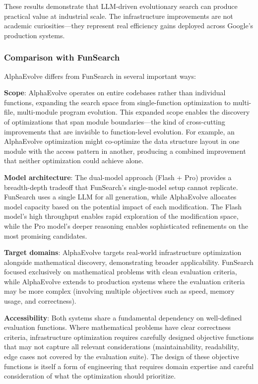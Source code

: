 These results demonstrate that LLM-driven evolutionary search can produce practical value at industrial scale. The infrastructure improvements are not academic curiosities---they represent real efficiency gains deployed across Google's production systems.

\subsubsection{Comparison with FunSearch}

AlphaEvolve differs from FunSearch in several important ways:

\textbf{Scope}: AlphaEvolve operates on entire codebases rather than individual functions, expanding the search space from single-function optimization to multi-file, multi-module program evolution. This expanded scope enables the discovery of optimizations that span module boundaries---the kind of cross-cutting improvements that are invisible to function-level evolution. For example, an AlphaEvolve optimization might co-optimize the data structure layout in one module with the access pattern in another, producing a combined improvement that neither optimization could achieve alone.

\textbf{Model architecture}: The dual-model approach (Flash + Pro) provides a breadth-depth tradeoff that FunSearch's single-model setup cannot replicate. FunSearch uses a single LLM for all generation, while AlphaEvolve allocates model capacity based on the potential impact of each modification. The Flash model's high throughput enables rapid exploration of the modification space, while the Pro model's deeper reasoning enables sophisticated refinements on the most promising candidates.

\textbf{Target domains}: AlphaEvolve targets real-world infrastructure optimization alongside mathematical discovery, demonstrating broader applicability. FunSearch focused exclusively on mathematical problems with clean evaluation criteria, while AlphaEvolve extends to production systems where the evaluation criteria may be more complex (involving multiple objectives such as speed, memory usage, and correctness).

\textbf{Accessibility}: Both systems share a fundamental dependency on well-defined evaluation functions. Where mathematical problems have clear correctness criteria, infrastructure optimization requires carefully designed objective functions that may not capture all relevant considerations (maintainability, readability, edge cases not covered by the evaluation suite). The design of these objective functions is itself a form of engineering that requires domain expertise and careful consideration of what the optimization should prioritize.

